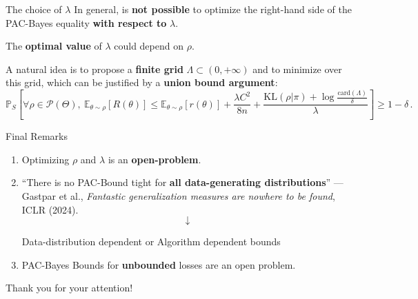 \documentclass[aspectratio=159]{beamer}
\begin{document}
    \begin{frame}{The choice of \(\lambda\)}
        In general, is \textbf{not possible} to optimize the right-hand side of the PAC-Bayes equality \textbf{with respect to} \(\lambda\).
        
        \pause
        
        The \textbf{optimal value} of \(\lambda\) could depend on \(\rho\).
        
        \pause
        
        A natural idea is to propose a \textbf{finite grid} \(\Lambda \subset (0, +\infty)\) and to minimize over this grid, which can be justified by a \textbf{union bound argument}:
                \[
        \mathbb{P}_S \left[ \forall \rho \in \mathcal{P}(\Theta), \ \mathbb{E}_{\theta \sim \rho}[R(\theta)] \leq \mathbb{E}_{\theta \sim \rho}[r(\theta)] + \frac{\lambda C^2}{8n} + \frac{\text{KL}(\rho|\pi) + \log\tfrac{\text{card}(\Lambda)}{\delta}}{\lambda}\right] \geq 1-\delta\,.
        \]
    \end{frame}

    \begin{frame}{Final Remarks}
        \begin{enumerate}
            \item Optimizing \(\rho\) and \(\lambda\) is an \textbf{open-problem}.
            \item ``There is no PAC-Bound tight for \textbf{all data-generating distributions}'' --- Gastpar et al., \textit{Fantastic generalization measures are nowhere to be found}, ICLR (2024).\pause
            \[\downarrow\]
            \begin{center}
            Data-distribution dependent or Algorithm dependent bounds
            \end{center}
            \item PAC-Bayes Bounds for \textbf{unbounded} losses are an open problem.
        \end{enumerate}
    \end{frame}

    \begin{frame}[standout]
        Thank you for your {\color{magenta}attention}!
    \end{frame}

    \begin{frame}[allowframebreaks]
    \nocite{*}
    \printbibliography[heading=none]
    \end{frame}

    
\end{document}
